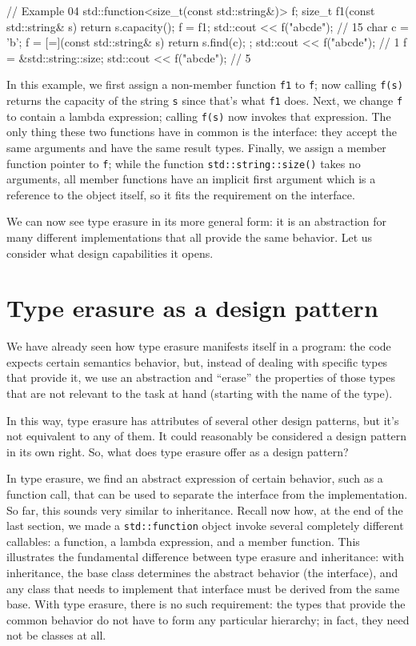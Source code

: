\begin{code}
// Example 04
std::function<size_t(const std::string&)> f;
size_t f1(const std::string& s) { return s.capacity(); }
f = f1;
std::cout << f("abcde");    // 15
char c = 'b';
f = [=](const std::string& s) { return s.find(c); };
std::cout << f("abcde");    // 1
f = &std::string::size;
std::cout << f("abcde");    // 5
\end{code}

In this example, we first assign a non-member function \texttt{f1} to \texttt{f}; now calling \texttt{f(s)} returns the capacity of the string \texttt{s} since that's what \texttt{f1} does. Next, we change \texttt{f} to contain a lambda expression; calling \texttt{f(s)} now invokes that expression. The only thing these two functions have in common is the interface: they accept the same arguments and have the same result types. Finally, we assign a member function pointer to \texttt{f}; while the function \texttt{std::string::size()} takes no arguments, all member functions have an implicit first argument which is a reference to the object itself, so it fits the requirement on the interface.

We can now see type erasure in its more general form: it is an abstraction for many different implementations that all provide the same behavior. Let us consider what design capabilities it opens.

\section{Type erasure as a design pattern}

We have already seen how type erasure manifests itself in a program: the code expects certain semantics behavior, but, instead of dealing with specific types that provide it, we use an abstraction and ``erase'' the properties of those types that are not relevant to the task at hand (starting with the name of the type).

In this way, type erasure has attributes of several other design patterns, but it's not equivalent to any of them. It could reasonably be considered a design pattern in its own right. So, what does type erasure offer as a design pattern?

In type erasure, we find an abstract expression of certain behavior, such as a function call, that can be used to separate the interface from the implementation. So far, this sounds very similar to inheritance. Recall now how, at the end of the last section, we made a \texttt{std::function} object invoke several completely different callables: a function, a lambda expression, and a member function. This illustrates the fundamental difference between type erasure and inheritance: with inheritance, the base class determines the abstract behavior (the interface), and any class that needs to implement that interface must be derived from the same base. With type erasure, there is no such requirement: the types that provide the common behavior do not have to form any particular hierarchy; in fact, they need not be classes at all.

